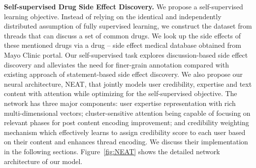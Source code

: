 \documentclass{bmcart}
\begin{document}



{\bf Self-supervised Drug Side Effect Discovery.} We propose a self-supervised learning objective. Instead of relying on the identical and independently distributed assumption of fully supervised learning, we construct the dataset from threads that can discuss a set of common drugs. We look up the side effects of these mentioned drugs via a drug -- side effect medical database obtained from Mayo Clinic portal. Our self-supervised task explores discussion-based side effect discovery and alleviates the need for finer-grain annotation compared with existing approach of statement-based side effect discovery.
We also propose our neural architecture, NEAT, that jointly models user credibility, expertise and text content with attention while optimizing for the self-supervised objective.
The network has three major components: user expertise representation with rich multi-dimensional vectors; cluster-sensitive attention being capable of focusing on relevant phases for post content encoding improvement; and credibility weighting mechanism which effectively learns to assign credibility score to each user based on their content and enhances thread encoding. 
We discuss their implementation in the following sections. 
Figure~\ref{fig:NEAT} shows the detailed network architecture of our model. \\
\end{document}
